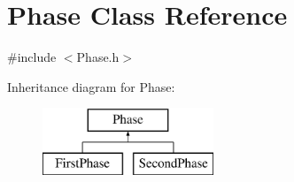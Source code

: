 \hypertarget{class_phase}{}\section{Phase Class Reference}
\label{class_phase}


{\ttfamily \#include $<$Phase.\+h$>$}

Inheritance diagram for Phase\+:\begin{figure}[H]
\begin{center}
\leavevmode
\includegraphics[height=2.000000cm]{class_phase}
\end{center}
\end{figure}
